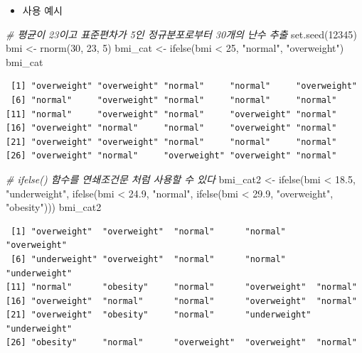 \documentclass[
  11pt,
]{krantz}
\newenvironment{Shaded}{\begin{snugshade}}{\end{snugshade}}
\newcommand{\CommentTok}[1]{\textcolor[rgb]{0.37,0.37,0.37}{\textit{#1}}}
\newcommand{\DecValTok}[1]{\textcolor[rgb]{0.06,0.06,0.06}{#1}}
\newcommand{\FloatTok}[1]{\textcolor[rgb]{0.06,0.06,0.06}{#1}}
\newcommand{\FunctionTok}[1]{\textcolor[rgb]{0,0,0}{#1}}
\newcommand{\NormalTok}[1]{#1}
\newcommand{\OtherTok}[1]{\textcolor[rgb]{0.37,0.37,0.37}{#1}}
\newcommand{\SpecialCharTok}[1]{\textcolor[rgb]{0,0,0}{#1}}
\newcommand{\StringTok}[1]{\textcolor[rgb]{0.5,0.5,0.5}{#1}}
\providecommand{\tightlist}{%
  \setlength{\itemsep}{0pt}\setlength{\parskip}{0pt}}
\begin{document}
\normalsize

\begin{itemize}
\tightlist
\item
  사용 예시
\end{itemize}

\footnotesize

\begin{Shaded}
\begin{Highlighting}[]
\CommentTok{\# 평균이 23이고 표준편차가 5인 정규분포로부터 30개의 난수 추출}
\FunctionTok{set.seed}\NormalTok{(}\DecValTok{12345}\NormalTok{)}
\NormalTok{bmi }\OtherTok{\textless{}{-}} \FunctionTok{rnorm}\NormalTok{(}\DecValTok{30}\NormalTok{, }\DecValTok{23}\NormalTok{, }\DecValTok{5}\NormalTok{) }
\NormalTok{bmi\_cat }\OtherTok{\textless{}{-}} \FunctionTok{ifelse}\NormalTok{(bmi }\SpecialCharTok{\textless{}} \DecValTok{25}\NormalTok{, }\StringTok{"normal"}\NormalTok{, }\StringTok{"overweight"}\NormalTok{)}
\NormalTok{bmi\_cat}
\end{Highlighting}
\end{Shaded}

\begin{verbatim}
 [1] "overweight" "overweight" "normal"     "normal"     "overweight"
 [6] "normal"     "overweight" "normal"     "normal"     "normal"    
[11] "normal"     "overweight" "normal"     "overweight" "normal"    
[16] "overweight" "normal"     "normal"     "overweight" "normal"    
[21] "overweight" "overweight" "normal"     "normal"     "normal"    
[26] "overweight" "normal"     "overweight" "overweight" "normal"    
\end{verbatim}

\begin{Shaded}
\begin{Highlighting}[]
\CommentTok{\# ifelse() 함수를 연쇄조건문 처럼 사용할 수 있다}
\NormalTok{bmi\_cat2 }\OtherTok{\textless{}{-}} \FunctionTok{ifelse}\NormalTok{(bmi }\SpecialCharTok{\textless{}} \FloatTok{18.5}\NormalTok{, }\StringTok{"underweight"}\NormalTok{, }
            \FunctionTok{ifelse}\NormalTok{(bmi }\SpecialCharTok{\textless{}} \FloatTok{24.9}\NormalTok{, }\StringTok{"normal"}\NormalTok{, }
            \FunctionTok{ifelse}\NormalTok{(bmi }\SpecialCharTok{\textless{}} \FloatTok{29.9}\NormalTok{, }\StringTok{"overweight"}\NormalTok{, }\StringTok{"obesity"}\NormalTok{)))}
\NormalTok{bmi\_cat2}
\end{Highlighting}
\end{Shaded}

\begin{verbatim}
 [1] "overweight"  "overweight"  "normal"      "normal"      "overweight" 
 [6] "underweight" "overweight"  "normal"      "normal"      "underweight"
[11] "normal"      "obesity"     "normal"      "overweight"  "normal"     
[16] "overweight"  "normal"      "normal"      "overweight"  "normal"     
[21] "overweight"  "obesity"     "normal"      "underweight" "underweight"
[26] "obesity"     "normal"      "overweight"  "overweight"  "normal"     
\end{verbatim}
\end{document}
